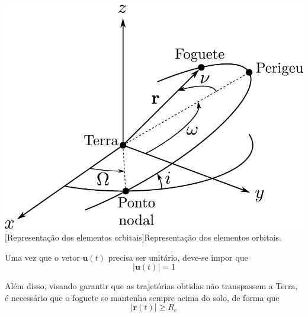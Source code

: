 \noindent	
\begin{minipage}{\textwidth}
	\vspace{\onelineskip}
	\centering
	\includegraphics[width=0.7\linewidth]{draw/resultados/pdf/coordenadasOrbitais}
	[Representação dos elementos orbitais]{Representação dos elementos orbitais.}
	\label{fig:foguete:orbitais}
	\vspace{\onelineskip}
\end{minipage}



Uma vez que o vetor $ \mathbf{u}(t) $ precisa ser unitário, deve-se impor que 
%
\begin{equation}
	|\mathbf{u}(t)| = 1	
\end{equation}

Além disso, visando garantir que as trajetórias obtidas não transpassem a Terra, é necessário que o foguete se mantenha sempre acima do solo, de forma que
%
\begin{equation}
	|\mathbf{r}(t)| \geq R_e	
\end{equation}


